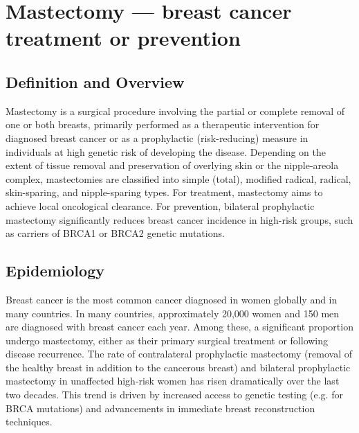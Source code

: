 \chapter{Mastectomy --- breast cancer treatment or prevention}

\section*{Definition and Overview}
Mastectomy is a surgical procedure involving the partial or complete removal of one or both breasts, primarily performed as a therapeutic intervention for diagnosed breast cancer or as a prophylactic (risk-reducing) measure in individuals at high genetic risk of developing the disease. Depending on the extent of tissue removal and preservation of overlying skin or the nipple-areola complex, mastectomies are classified into simple (total), modified radical, radical, skin-sparing, and nipple-sparing types. For treatment, mastectomy aims to achieve local oncological clearance. For prevention, bilateral prophylactic mastectomy significantly reduces breast cancer incidence in high-risk groups, such as carriers of BRCA1 or BRCA2 genetic mutations.

\section*{Epidemiology}
Breast cancer is the most common cancer diagnosed in women globally and in many countries. In many countries, approximately 20,000 women and 150 men are diagnosed with breast cancer each year. Among these, a significant proportion undergo mastectomy, either as their primary surgical treatment or following disease recurrence. The rate of contralateral prophylactic mastectomy (removal of the healthy breast in addition to the cancerous breast) and bilateral prophylactic mastectomy in unaffected high-risk women has risen dramatically over the last two decades. This trend is driven by increased access to genetic testing (e.g. for BRCA mutations) and advancements in immediate breast reconstruction techniques.


